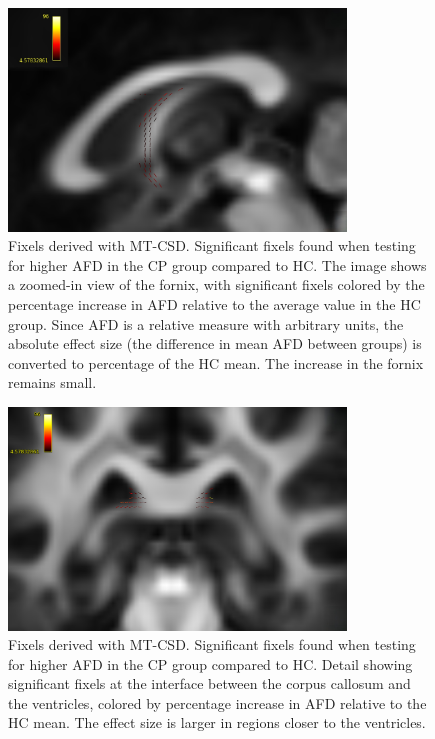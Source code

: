\begin{figure}[H]
  \centering
  \includegraphics[width=0.8\textwidth]{Images/fornix2.jpg} %
  \caption{Fixels derived with MT-CSD. Significant fixels found when testing for higher AFD in the CP group compared to HC. The image shows a zoomed-in view of the fornix, with significant fixels colored by the percentage increase in AFD relative to the average value in the HC group. Since AFD is a relative measure with arbitrary units, the absolute effect size (the difference in mean AFD between groups) is converted to percentage of the HC mean. The increase in the fornix remains small.}
  \label{fig:fornix2}
\end{figure}


\begin{figure}[H]
  \centering
  \includegraphics[width=0.8\textwidth]{Images/inter.jpg} %
  \caption{Fixels derived with MT-CSD. Significant fixels found when testing for higher AFD in the CP group compared to HC. Detail showing significant fixels at the interface between the corpus callosum and the ventricles, colored by percentage increase in AFD relative to the HC mean. The effect size is larger in regions closer to the ventricles.}
  \label{fig:inter}
\end{figure}

